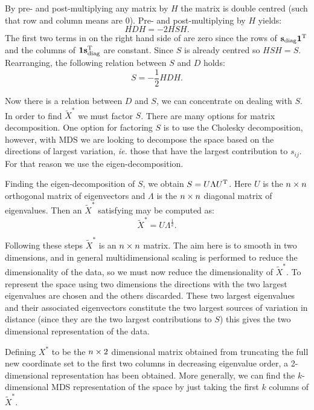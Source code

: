 By pre- and post-multiplying any matrix by $H$ the matrix is double centred (such that row and column means are 0). Pre- and post-multiplying  by $H$ yields:
\begin{equation}
HDH = -2HSH.
\end{equation}
The first two terms in on the right hand side of  are zero since the rows of $\mathbf{s}_\text{diag}\mathbf{1}^{\text{T}}$ and the columns of  $\mathbf{1}\mathbf{s}_\text{diag}^{\text{T}}$ are constant. Since $S$ is already centred so $HSH=S$. Rearranging, the following relation between $S$ and $D$ holds:
\begin{equation}
S = -\frac{1}{2}HDH.
\end{equation}

Now there is a relation between $D$ and $S$, we can concentrate on dealing with $S$. In order to find $\tilde{X}^{*}$ we must factor $S$. There are many options for matrix decomposition. One option for factoring $S$ is to use the Cholesky decomposition, however, with MDS we are looking to decompose the space based on the directions of largest variation, \emph{ie.} those that have the largest contribution to $s_{ij}$. For that reason we use the eigen-decomposition.

Finding the eigen-decomposition of $S$, we obtain $S=U\Lambda U^{\text{T}}$. Here $U$ is the $n \times n$ orthogonal matrix of eigenvectors and $\Lambda$ is the $n \times n$ diagonal matrix of eigenvalues. Then an $\tilde{X}^*$ satisfying  may be computed as:
\begin{equation}
\tilde{X}^*=U\Lambda^{\frac{1}{2}}.
\end{equation}

Following these steps $\tilde{X}^*$ is an $n \times n$ matrix. The aim here is to smooth in two dimensions, and in general multidimensional scaling is performed to reduce the dimensionality of the data, so we must now reduce the dimensionality of $\tilde{X}^*$. To represent the space using two dimensions the directions with the two largest eigenvalues are chosen and the others discarded. These two largest eigenvalues and their associated eigenvectors constitute the two largest sources of variation in distance (since they are the two largest contributions to $S$) this gives the two dimensional representation of the data. 

Defining $X^*$ to be the $n \times 2$ dimensional matrix obtained from truncating the full new coordinate set to the first two columns in decreasing eigenvalue order, a 2-dimensional representation has been obtained. More generally, we can find the $k$-dimensional MDS representation of the space by just taking the first $k$ columns of $\tilde{X}^*$.

